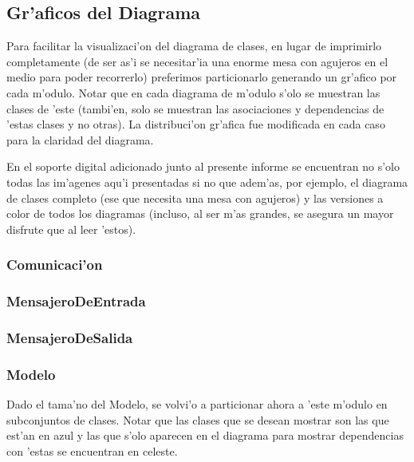 \subsection{Gr'aficos del Diagrama}
Para facilitar la visualizaci'on del diagrama de clases, en lugar de imprimirlo completamente (de ser as'i se necesitar'ia una enorme mesa con agujeros en el medio para poder recorrerlo) preferimos particionarlo generando un gr'afico por cada m'odulo. Notar que en cada diagrama de m'odulo s'olo se muestran las clases de 'este (tambi'en, solo se muestran las asociaciones y dependencias de 'estas clases y no otras). La distribuci'on gr'afica fue modificada en cada caso para la claridad del diagrama. 

En el soporte digital adicionado junto al presente informe se encuentran no s'olo todas las im'agenes aqu'i presentadas si no que adem'as, por ejemplo, el diagrama de clases completo (ese que necesita una mesa con agujeros) y las versiones a color de todos los diagramas (incluso, al ser m'as grandes, se asegura un mayor disfrute que al leer 'estos).
\clearpage


\subsubsection{Comunicaci'on}
\clearpage

\subsubsection{MensajeroDeEntrada}
\clearpage

\subsubsection{MensajeroDeSalida}
\clearpage

\subsubsection{Modelo}
Dado el tama'no del Modelo, se volvi'o a particionar ahora a 'este m'odulo en subconjuntos de clases. Notar que las clases que se desean mostrar son las que est'an en azul y las que s'olo aparecen en el diagrama para mostrar dependencias con 'estas se encuentran en celeste.

